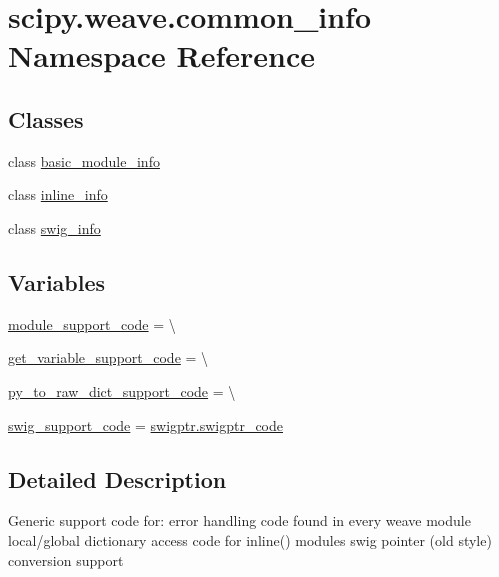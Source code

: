 \hypertarget{namespacescipy_1_1weave_1_1common__info}{}\section{scipy.\+weave.\+common\+\_\+info Namespace Reference}
\label{namespacescipy_1_1weave_1_1common__info}
\subsection*{Classes}
\begin{DoxyCompactItemize}
\item 
class \hyperlink{classscipy_1_1weave_1_1common__info_1_1basic__module__info}{basic\+\_\+module\+\_\+info}
\item 
class \hyperlink{classscipy_1_1weave_1_1common__info_1_1inline__info}{inline\+\_\+info}
\item 
class \hyperlink{classscipy_1_1weave_1_1common__info_1_1swig__info}{swig\+\_\+info}
\end{DoxyCompactItemize}
\subsection*{Variables}
\begin{DoxyCompactItemize}
\item 
\hyperlink{namespacescipy_1_1weave_1_1common__info_add3b2ebce59a2ce1e544bacbd8dce04d}{module\+\_\+support\+\_\+code} = \textbackslash{}
\item 
\hyperlink{namespacescipy_1_1weave_1_1common__info_ad16983b3d3257b322bcb50806f3f6516}{get\+\_\+variable\+\_\+support\+\_\+code} = \textbackslash{}
\item 
\hyperlink{namespacescipy_1_1weave_1_1common__info_a6a8c9164bef69a30a3bc7b742f4c80e5}{py\+\_\+to\+\_\+raw\+\_\+dict\+\_\+support\+\_\+code} = \textbackslash{}
\item 
\hyperlink{namespacescipy_1_1weave_1_1common__info_ab1464024f4a32f5d12b65df44a055ae0}{swig\+\_\+support\+\_\+code} = \hyperlink{namespacescipy_1_1weave_1_1swigptr_a4ea019848c2d352771c20f2ba29aed95}{swigptr.\+swigptr\+\_\+code}
\end{DoxyCompactItemize}


\subsection{Detailed Description}
\begin{DoxyVerb}Generic support code for:
error handling code found in every weave module
local/global dictionary access code for inline() modules
swig pointer (old style) conversion support\end{DoxyVerb}
 

